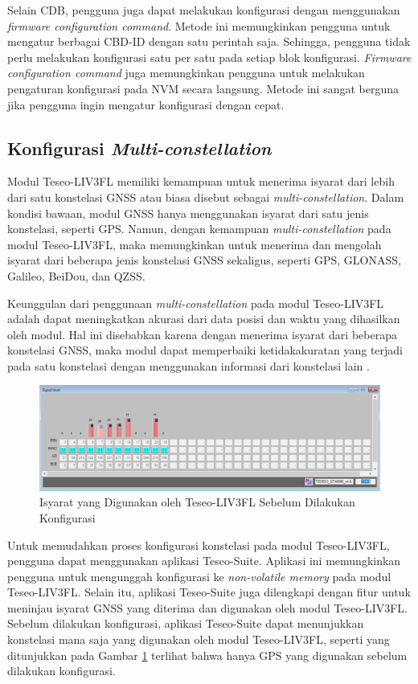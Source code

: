 Selain CDB, pengguna juga dapat melakukan konfigurasi dengan menggunakan \textit{firmware configuration command}. Metode ini memungkinkan pengguna untuk mengatur berbagai CBD-ID dengan satu perintah saja. Sehingga, pengguna tidak perlu melakukan konfigurasi satu per satu pada setiap blok konfigurasi. \textit{Firmware configuration command} juga memungkinkan pengguna untuk melakukan pengaturan konfigurasi pada NVM secara langsung. Metode ini sangat berguna jika pengguna ingin mengatur konfigurasi dengan cepat.

\subsection{Konfigurasi \textit{Multi-constellation}}
Modul Teseo\hyp{}LIV3FL memiliki kemampuan untuk menerima isyarat dari lebih dari satu konstelasi GNSS atau biasa disebut sebagai \textit{multi-constellation}. Dalam kondisi bawaan, modul GNSS hanya menggunakan isyarat dari satu jenis konstelasi, seperti GPS. Namun, dengan kemampuan \textit{multi-constellation} pada modul Teseo\hyp{}LIV3FL, maka memungkinkan untuk menerima dan mengolah isyarat dari beberapa jenis konstelasi GNSS sekaligus, seperti GPS, GLONASS, Galileo, BeiDou, dan QZSS.
 
Keunggulan dari penggunaan \textit{multi-constellation} pada modul Teseo\hyp{}LIV3FL adalah dapat meningkatkan akurasi dari data posisi dan waktu yang dihasilkan oleh modul. Hal ini disebabkan karena dengan menerima isyarat dari beberapa konstelasi GNSS, maka modul dapat memperbaiki ketidakakuratan yang terjadi pada satu konstelasi dengan menggunakan informasi dari konstelasi lain \cite{An2020}.
 
\begin{figure}[H]
	\centering
	\includegraphics[width=14cm]{contents/chapter-3/setting-konstelasi/sebelum-konfigurasi.png}
	\caption{Isyarat yang Digunakan oleh Teseo\hyp{}LIV3FL Sebelum Dilakukan Konfigurasi}
	\label{Fig: sebelum-konfigurasi}
\end{figure}

 Untuk memudahkan proses konfigurasi konstelasi pada modul Teseo\hyp{}LIV3FL, pengguna dapat menggunakan aplikasi Teseo-Suite. Aplikasi ini memungkinkan pengguna untuk mengunggah konfigurasi ke \textit{non-volatile memory} pada modul Teseo\hyp{}LIV3FL. Selain itu, aplikasi Teseo-Suite juga dilengkapi dengan fitur untuk meninjau isyarat GNSS yang diterima dan digunakan oleh modul Teseo\hyp{}LIV3FL. Sebelum dilakukan konfigurasi, aplikasi Teseo-Suite dapat menunjukkan konstelasi mana saja yang digunakan oleh modul Teseo\hyp{}LIV3FL, seperti yang ditunjukkan pada Gambar \ref{Fig: sebelum-konfigurasi} terlihat bahwa hanya GPS yang digunakan sebelum dilakukan konfigurasi.
 
